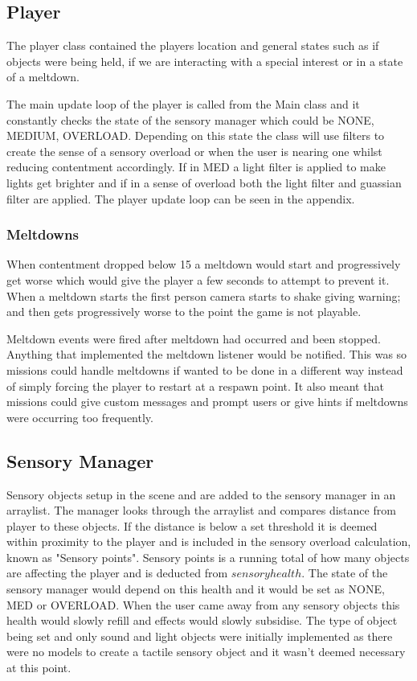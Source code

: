 \subsection{Player}
The player class contained the players location and general states such as if objects were being held, if we are interacting with a special interest or in a state of a meltdown.

The main update loop of the player is called from the Main class and it constantly checks the state of the sensory manager which could be NONE, MEDIUM, OVERLOAD. Depending on this state the class will use filters to create the sense of a sensory overload or when the user is nearing one whilst reducing contentment accordingly. If in MED a light filter is applied to make lights get brighter and if in a sense of overload both the light filter and guassian filter are applied. The player update loop can be seen in the appendix.  
 
\subsubsection{Meltdowns}
When contentment dropped below 15 a meltdown would start and progressively get worse which would give the player a few seconds to attempt to prevent it. When a meltdown starts the first person camera starts to shake giving warning; and then gets progressively worse to the point the game is not playable. 

Meltdown events were fired after meltdown had occurred and been stopped. Anything that implemented the meltdown listener would be notified. This was so missions could handle meltdowns if wanted to be done in a different way instead of simply forcing the player to restart at a respawn point. It also meant that missions could give custom messages and prompt users or give hints if meltdowns were occurring too frequently.


\subsection{Sensory Manager}

Sensory objects setup in the scene and are added to the sensory manager in an arraylist. The manager looks through the arraylist and compares distance from player to these objects. If the distance is below a set threshold it is deemed within proximity to the player and is included in the sensory overload calculation, known as "Sensory points". Sensory points is a running total of how many objects are affecting the player and is deducted from $sensory health$. The state of the sensory manager would depend on this health and it would be set as NONE, MED or OVERLOAD. When the user came away from any sensory objects this health would slowly refill and effects would slowly subsidise. The type of object being set and only sound and light objects were initially implemented as there were no models to create a tactile sensory object and it wasn't deemed necessary at this point. 


